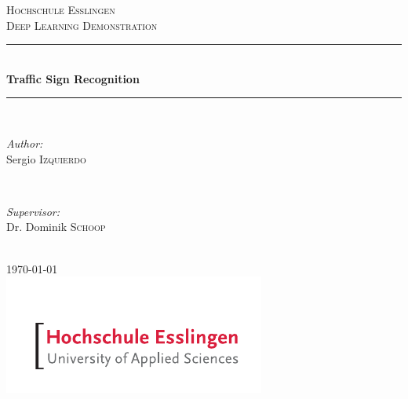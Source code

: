 \begin{titlepage}

\newcommand{\HRule}{\rule{\linewidth}{0.5mm}} %
\center %

\textsc{\LARGE Hochschule Esslingen}\\[1.5cm] %
\textsc{\Large Deep Learning Demonstration}\\[0.5cm] %

\HRule \\[0.4cm]
{ \huge \bfseries Traffic Sign Recognition}\\[0.4cm] %
\HRule \\[1.5cm]

\begin{minipage}{0.4\textwidth}
\begin{flushleft} \large
\emph{Author:}\\
Sergio \textsc{Izquierdo} %
\end{flushleft}
\end{minipage}
~
\begin{minipage}{0.4\textwidth}
\begin{flushright} \large
\emph{Supervisor:} \\
Dr. Dominik \textsc{Schoop} %
\end{flushright}
\end{minipage}\\[2cm]

{\large \today}\\[2cm] %

\includegraphics[scale=1.5]{images/he_logo.pdf}\\[1cm]

\vfill %

\end{titlepage}
